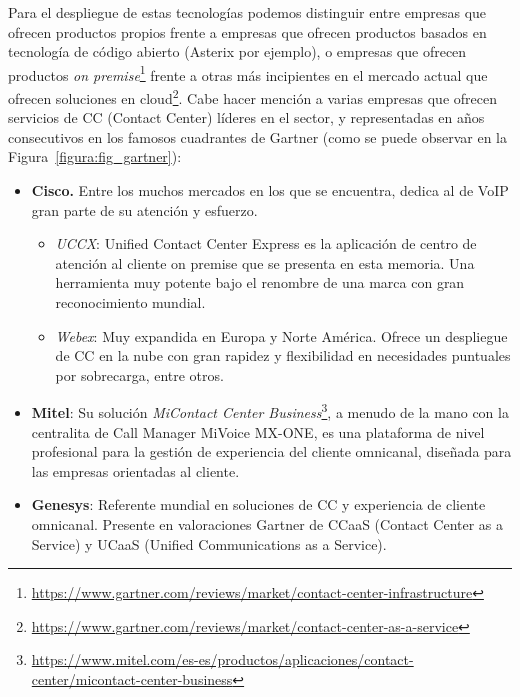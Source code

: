\documentclass[a4paper, 12pt]{book}
\begin{document}
Para el despliegue de estas tecnologías podemos distinguir entre empresas que ofrecen productos propios frente a empresas que ofrecen productos basados en tecnología de código abierto (Asterix por ejemplo), o empresas que ofrecen productos \emph{on premise}\footnote{\url{https://www.gartner.com/reviews/market/contact-center-infrastructure}} frente a otras más incipientes en el mercado actual que ofrecen soluciones en cloud\footnote{\url{https://www.gartner.com/reviews/market/contact-center-as-a-service}}. Cabe hacer mención a varias empresas que ofrecen servicios de CC (Contact Center)  líderes en el sector, y representadas en años consecutivos en los famosos cuadrantes de Gartner (como se puede observar en la Figura~\ref{figura:fig_gartner}):
\begin{itemize}
  \item \textbf{Cisco.} Entre los muchos mercados en los que se encuentra, dedica al de VoIP gran parte de su atención y esfuerzo.   

  \begin{itemize}
    \item \emph{UCCX}: Unified Contact Center Express es la aplicación de centro de atención al cliente on premise que se presenta en esta memoria. Una herramienta muy potente bajo el renombre de una marca con gran reconocimiento mundial.
    \item \emph{Webex}: Muy expandida en Europa y Norte América. Ofrece un despliegue de CC en la nube con gran rapidez y flexibilidad en necesidades puntuales por sobrecarga, entre otros.
  \end{itemize}  

  \item \textbf{Mitel}: Su solución \emph{MiContact Center Business}\footnote{\url{https://www.mitel.com/es-es/productos/aplicaciones/contact-center/micontact-center-business}}, a menudo de la mano con la centralita de Call Manager MiVoice MX-ONE, es una plataforma de nivel profesional para la gestión de experiencia del cliente omnicanal, diseñada para las empresas orientadas al cliente.

  \item \textbf{Genesys}: Referente mundial en soluciones de CC y experiencia de cliente omnicanal. Presente en valoraciones Gartner de CCaaS (Contact Center as a Service) y UCaaS (Unified Communications as a Service).
\end{itemize}
\end{document}
